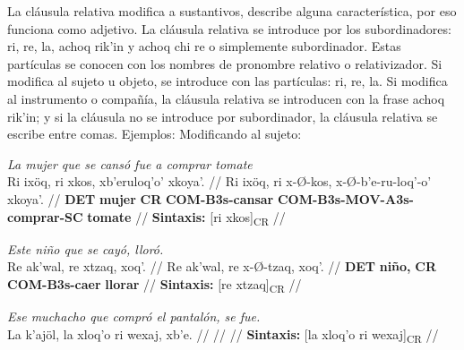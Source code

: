 \documentclass{article}%
\begin{document}
%
La cláusula relativa modifica a sustantivos, describe alguna característica, por eso %
funciona como adjetivo. La cláusula relativa se introduce por los subordinadores: ri, %
re, la, achoq rik'in y achoq chi re o simplemente subordinador. Estas partículas se %
conocen con los nombres de pronombre relativo o relativizador. Si modifica al sujeto u %
objeto, se introduce con las partículas: ri, re, la. Si modifica al instrumento o compañía, %
la cláusula relativa se introducen con la frase achoq rik'in; y si la cláusula no se %
introduce por subordinador, la cláusula relativa se escribe entre comas. Ejemplos: %
Modificando al sujeto: %
\par\medskip%
\ex
\textit{La mujer que se cansó fue a comprar tomate} \\
\begingl
\gla Ri ixöq, ri xkos, xb'eruloq'o' xkoya'. //
\glb Ri ixöq, ri x-Ø-kos, x-Ø-b'e-ru-loq'-o' xkoya'. //
\glc \textbf{DET} \textbf{mujer} \textbf{CR} \textbf{COM-}\textbf{B3s-}\textbf{cansar} \textbf{COM-}\textbf{B3s-}\textbf{MOV-}\textbf{A3s-}\textbf{comprar-}\textbf{SC} \textbf{tomate} //
\glft \textbf{Sintaxis:} [ri xkos]\textsubscript{CR} //
\endgl
\xe
%
\medskip%
\par\medskip%
\ex
\textit{Este niño que se cayó, lloró.} \\
\begingl
\gla Re ak'wal, re xtzaq, xoq'. //
\glb Re ak'wal, re x-Ø-tzaq, xoq'. //
\glc \textbf{DET} \textbf{niño,} \textbf{CR} \textbf{COM-}\textbf{B3s-}\textbf{caer} \textbf{llorar} //
\glft \textbf{Sintaxis:} [re xtzaq]\textsubscript{CR} //
\endgl
\xe
%
\medskip%
\par\medskip%
\ex
\textit{Ese muchacho que compró el pantalón, se fue.} \\
\begingl
\gla La k'ajöl, la xloq'o ri wexaj, xb'e. //
\glb  //
\glc  //
\glft \textbf{Sintaxis:} [la xloq'o ri wexaj]\textsubscript{CR} //
\endgl
\xe
%
\medskip

%
\end{document}
